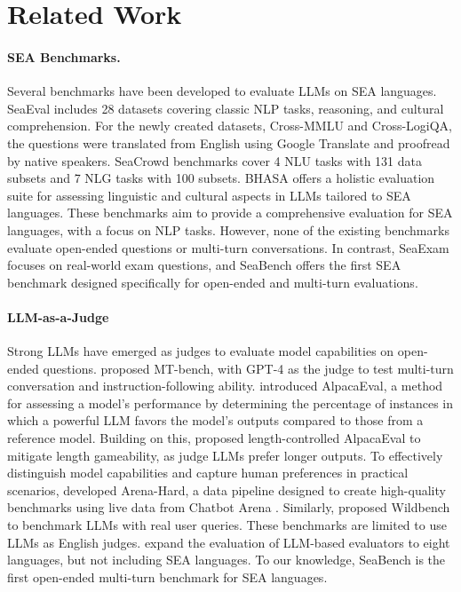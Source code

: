 \section{Related Work} 

\paragraph{SEA Benchmarks.}
Several benchmarks have been developed to evaluate LLMs on SEA languages. SeaEval \cite{wang_seaeval_2023} includes 28 datasets covering classic NLP tasks, reasoning, and cultural comprehension. For the newly created datasets, Cross-MMLU and Cross-LogiQA, the questions were translated from English using Google Translate and proofread by native speakers. SeaCrowd benchmarks \cite{lovenia_seacrowd_2024} cover 4 NLU tasks with 131 data subsets and 7 NLG tasks with 100 subsets. BHASA \cite{leong_bhasa_nodate} offers a holistic evaluation suite for assessing linguistic and cultural aspects in LLMs tailored to SEA languages. These benchmarks aim to provide a comprehensive evaluation for SEA languages, with a focus on NLP tasks. However, none of the existing benchmarks evaluate open-ended questions or multi-turn conversations. In contrast, SeaExam focuses on real-world exam questions, and SeaBench offers the first SEA benchmark designed specifically for open-ended and multi-turn evaluations.

\paragraph{LLM-as-a-Judge}
Strong LLMs have emerged as judges to evaluate model capabilities on open-ended questions.
\citet{zheng_judging_2023} proposed MT-bench, with GPT-4 as the judge to test multi-turn conversation and instruction-following ability. \citet{alpaca_eval} introduced AlpacaEval, a method for assessing a model’s performance by determining the percentage of instances in which a powerful LLM favors the model’s outputs compared to those from a reference model. Building on this, \citet{dubois2024length} proposed length-controlled AlpacaEval to mitigate length gameability, as judge LLMs prefer longer outputs. To effectively distinguish model capabilities and capture human preferences in practical scenarios, \citet{li_crowdsourced_2024} developed Arena-Hard, a data pipeline designed to create high-quality benchmarks using live data from Chatbot Arena \cite{zheng_judging_2023}. Similarly, \citet{lin_wildbench_2024} proposed Wildbench to benchmark LLMs with real user queries. These benchmarks are limited to use LLMs as English judges. \citet{hada-etal-2024-large} expand the evaluation of LLM-based evaluators to eight languages, but not including SEA languages. To our knowledge, SeaBench is the first open-ended multi-turn benchmark for SEA languages. 

